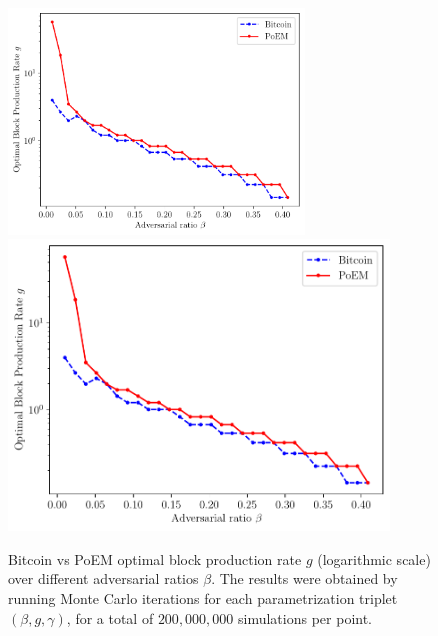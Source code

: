 \begin{figure}[h]
    \centering
    \ifusenix
        \includegraphics[width = 0.7\textwidth]{figures/optimal_g.pdf}
    \else
        \includegraphics[width = 0.9\textwidth]{figures/optimal_g.pdf}
    \fi

    \caption{Bitcoin vs PoEM optimal block production rate $g$ (logarithmic scale) over different adversarial ratios $\beta$.
             The results were obtained by running \montecarlo{} Monte Carlo iterations for each parametrization triplet
             $(\beta, g, \gamma)$, for a total of $200{,}000{,}000$ simulations per point.}
    \label{fig:g}
\end{figure}

